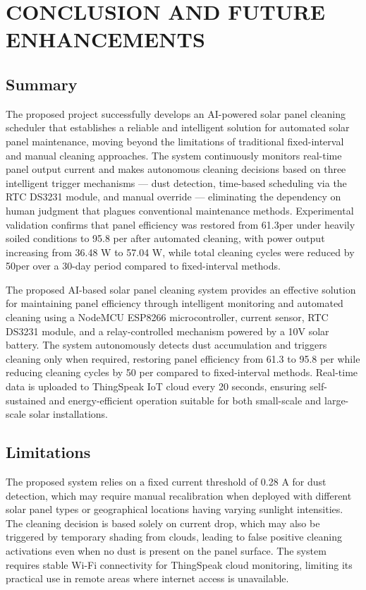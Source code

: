 \documentclass[10pt]{report}
\begin{document}
\begin{sloppypar}
{{{\begin{sloppypar}
\chapter{CONCLUSION AND FUTURE ENHANCEMENTS}
\linespread{1.5}
\section{Summary}
\hspace{0.5cm}The proposed project successfully develops an AI-powered solar panel cleaning scheduler that establishes a reliable and intelligent solution for automated solar panel maintenance, moving beyond the limitations of traditional fixed-interval and manual cleaning approaches. The system continuously monitors real-time panel output current and makes autonomous cleaning decisions based on three intelligent trigger mechanisms — dust detection, time-based scheduling via the RTC DS3231 module, and manual override — eliminating the dependency on human judgment that plagues conventional maintenance methods. Experimental validation confirms that panel efficiency was restored from 61.3per under heavily soiled conditions to 95.8 per after automated cleaning, with power output increasing from 36.48 W to 57.04 W, while total cleaning cycles were reduced by 50per over a 30-day period compared to fixed-interval methods.

The proposed AI-based solar panel cleaning system provides an effective solution for maintaining panel efficiency through intelligent monitoring and automated cleaning using a NodeMCU ESP8266 microcontroller, current sensor, RTC DS3231 module, and a relay-controlled mechanism powered by a 10V solar battery. The system autonomously detects dust accumulation and triggers cleaning only when required, restoring panel efficiency from 61.3 to 95.8 per while reducing cleaning cycles by 50 per compared to fixed-interval methods. Real-time data is uploaded to ThingSpeak IoT cloud every 20 seconds, ensuring self-sustained and energy-efficient operation suitable for both small-scale and large-scale solar installations.

\section{Limitations}
\hspace{0.5cm}The proposed system relies on a fixed current threshold of 0.28 A for dust detection, which may require manual recalibration when deployed with different solar panel types or geographical locations having varying sunlight intensities. The cleaning decision is based solely on current drop, which may also be triggered by temporary shading from clouds, leading to false positive cleaning activations even when no dust is present on the panel surface.
The system requires stable Wi-Fi connectivity for ThingSpeak cloud monitoring, limiting its practical use in remote areas where internet access is unavailable. 


\end{sloppypar}}}}
\end{sloppypar}
\end{document}
